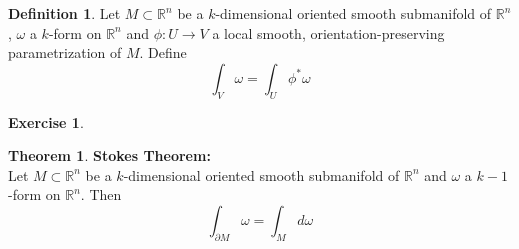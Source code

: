 \documentclass[12pt]{amsart}
\theoremstyle{definition}
\newtheorem{defn}[definition]{Definition}
\newtheorem{thm}[definition]{Theorem}
\newtheorem{ex}[definition]{Exercise}
\newcommand{\om}{\omega}
\newcommand{\R}{\mathbb{R}}
\begin{document}
	\begin{defn}
		Let $M \subset \R^n$ be a $k$-dimensional oriented smooth submanifold of $\R^n$, $\om$ a $k$-form on $\R^n$ and $\phi: U \rightarrow V$ a local smooth, orientation-preserving parametrization of $M$. Define $$\int_V \om = \int_U \phi^*\om $$
	\end{defn} 

	\begin{ex}
		
	\end{ex}

	\begin{thm}\textbf{Stokes Theorem:}\\
		Let $M \subset \R^n$ be a $k$-dimensional oriented smooth submanifold of $\R^n$ and $\om$ a $k-1$-form on $\R^n$. Then $$\int_{\partial M} \om = \int_M d \om$$
	\end{thm}
\end{document}
